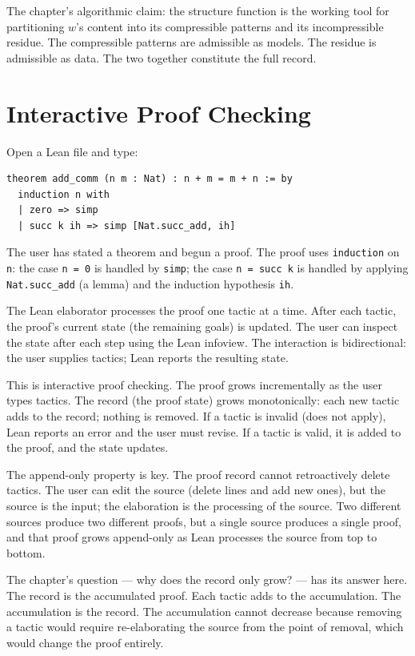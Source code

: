 The chapter's algorithmic claim: the structure function is the
working tool for partitioning $w$'s content into its compressible
patterns and its incompressible residue. The compressible patterns
are admissible as models. The residue is admissible as data. The
two together constitute the full record.

\section{Interactive Proof Checking}
\label{se:interactive-proof-checking}

Open a Lean file and type:
\begin{verbatim}
theorem add_comm (n m : Nat) : n + m = m + n := by
  induction n with
  | zero => simp
  | succ k ih => simp [Nat.succ_add, ih]
\end{verbatim}
The user has stated a theorem and begun a proof. The proof uses
\texttt{induction} on \texttt{n}: the case \texttt{n = 0} is handled
by \texttt{simp}; the case \texttt{n = succ k} is handled by
applying \texttt{Nat.succ\_add} (a lemma) and the induction
hypothesis \texttt{ih}.

The Lean elaborator processes the proof one tactic at a time. After
each tactic, the proof's current state (the remaining goals) is
updated. The user can inspect the state after each step using the
Lean infoview. The interaction is bidirectional: the user supplies
tactics; Lean reports the resulting state.

This is interactive proof checking. The proof grows incrementally
as the user types tactics. The record (the proof state) grows
monotonically: each new tactic adds to the record; nothing is
removed. If a tactic is invalid (does not apply), Lean reports an
error and the user must revise. If a tactic is valid, it is added
to the proof, and the state updates.

The append-only property is key. The proof record cannot retroactively
delete tactics. The user can edit the source (delete lines and add
new ones), but the source is the input; the elaboration is the
processing of the source. Two different sources produce two
different proofs, but a single source produces a single proof, and
that proof grows append-only as Lean processes the source from top
to bottom.

The chapter's question --- why does the record only grow? --- has its
answer here. The record is the accumulated proof. Each tactic adds
to the accumulation. The accumulation is the record. The
accumulation cannot decrease because removing a tactic would
require re-elaborating the source from the point of removal, which
would change the proof entirely.

